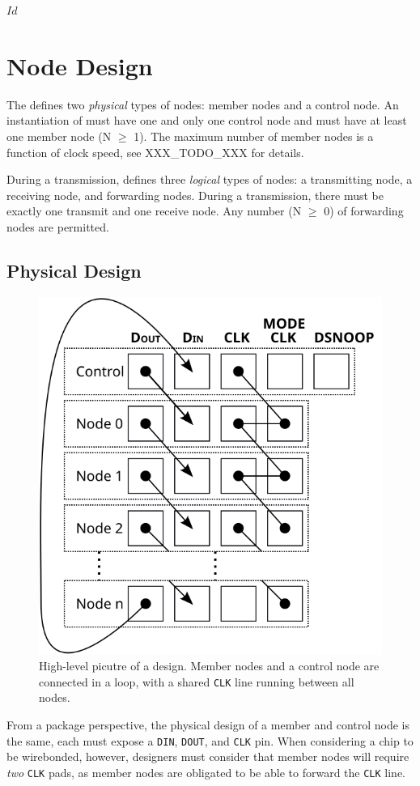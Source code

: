 \svnInfo $Id$

\section{Node Design}
\label{sec:node}
The \bus defines two {\em physical} types of nodes: member nodes and a control
node. An instantiation of \bus must have one and only one control node and
must have at least one member node (N $\geq$ 1). The maximum number of member
nodes is a function of clock speed, see XXX\_TODO\_XXX for details.

During a transmission, \bus defines three {\em logical} types of nodes:
a transmitting node, a receiving node, and forwarding nodes. During a
transmission, there must be exactly one transmit and one receive node. Any
number (N $\geq$ 0) of forwarding nodes are permitted.

\subsection{Physical Design}
\label{sec:physical}

\begin{figure}
\begin{center}
\includegraphics[width=0.5\linewidth]{img/stacked_layers}
\end{center}
\caption{High-level picutre of a \bus design. Member nodes and a control node
are connected in a loop, with a shared {\tt CLK} line running between all
nodes.}
\label{fig:bus}
\end{figure}

From a package perspective, the physical design of a member and control node
is the same, each must expose a {\tt DIN}, {\tt DOUT}, and {\tt CLK} pin. When
considering a chip to be wirebonded, however, designers must consider that
member nodes will require {\em two} {\tt CLK} pads, as member nodes are
obligated to be able to forward the {\tt CLK} line.

